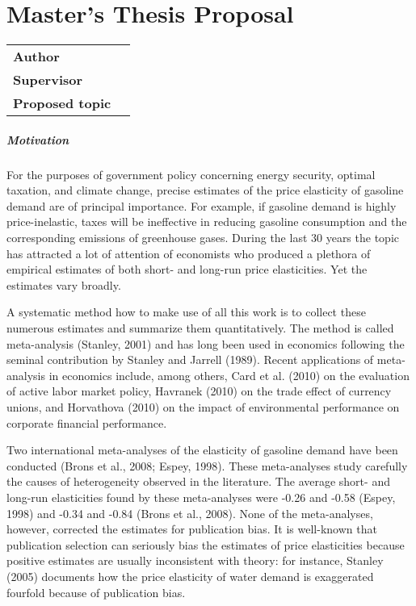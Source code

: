 \chapter*{Master's Thesis Proposal}

\begin{tabular}{lp{10.1cm}}
		\hline
		\textbf{Author} &\href{mailto:\Email}{\AutorDP}\\
		\textbf{Supervisor} &\href{mailto:\EmailSup}{\Supervisor}\\
		\textbf{Proposed topic} &\Bookname\\
		\hline
\end{tabular}

\bigskip

\small
\paragraph{Motivation}

For the purposes of government policy concerning energy security, optimal taxation, and climate change, precise estimates of the price elasticity of gasoline demand are of principal importance. For example, if gasoline demand is highly price-inelastic, taxes will be ineffective in reducing gasoline consumption and the corresponding emissions of greenhouse gases. During the last 30 years the topic has attracted a lot of attention of economists who produced a plethora of empirical estimates of both short- and long-run price elasticities. Yet the estimates vary broadly.

A systematic method how to make use of all this work is to collect these numerous estimates and summarize them quantitatively. The method is called meta-analysis (Stanley, 2001) and has long been used in economics following the seminal contribution by Stanley and Jarrell (1989). Recent applications of meta-analysis in economics include, among others, Card et al. (2010) on the evaluation of active labor market policy, Havranek (2010) on the trade effect of currency unions, and Horvathova (2010) on the impact of environmental performance on corporate financial performance.

Two international meta-analyses of the elasticity of gasoline demand have been conducted (Brons et al., 2008; Espey, 1998). These meta-analyses study carefully the causes of heterogeneity observed in the literature. The average short- and long-run elasticities found by these meta-analyses were -0.26 and -0.58 (Espey, 1998) and
-0.34 and -0.84 (Brons et al., 2008). None of the meta-analyses, however, corrected the estimates for publication bias. It is well-known that publication selection can seriously bias the estimates of price elasticities because positive estimates are usually inconsistent with theory: for instance, Stanley (2005) documents how the price elasticity of water demand is exaggerated fourfold because of publication bias.


